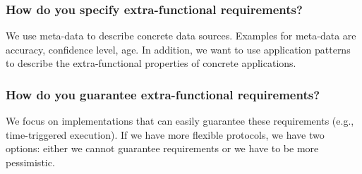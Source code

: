 \subsubsection{How do you specify extra-functional requirements?}

We use meta-data to describe concrete data sources.
Examples for meta-data are accuracy, confidence level, age.
In addition, we want to use application patterns to describe the extra-functional properties of concrete applications.

\subsubsection{How do you guarantee extra-functional requirements?}

We focus on implementations that can easily guarantee these requirements (e.g., time-triggered execution).
If we have more flexible protocols, we have two options: either we cannot guarantee requirements or we have to be more pessimistic.

